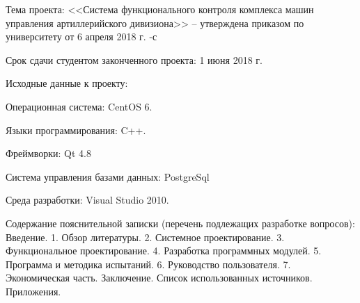 {    \begin{flushleft}
        \begin{legal}
        \item Тема проекта: <<Система функционального контроля комплекса машин управления артиллерийского дивизиона>> --
            утверждена приказом по университету от 6 апреля 2018 г. -с

            \vspace{1em}

        \item Срок сдачи студентом законченного проекта: 1 июня 2018 г.

            \vspace{1em}

        \item Исходные данные к проекту:

            \begin{legal}
            \item Операционная система: CentOS 6.
            \item Языки программирования: C++.
            \item Фреймворки: Qt 4.8
            \item Система управления базами данных: PostgreSql
            \item Среда разработки: Visual Studio 2010.
            \end{legal}

            \vspace{1em}

        \item Содержание пояснительной записки (перечень подлежащих разработке вопросов):
            Введение.
            1. Обзор литературы.
            2. Системное проектирование.
            3. Функциональное проектирование.
            4. Разработка программных модулей.
            5. Программа и методика испытаний.
            6. Руководство пользователя.
            7. Экономическая часть.
            Заключение.
            Список использованных источников.
            Приложения.

            \vspace{1em}


\end{legal}
\end{flushleft}}
